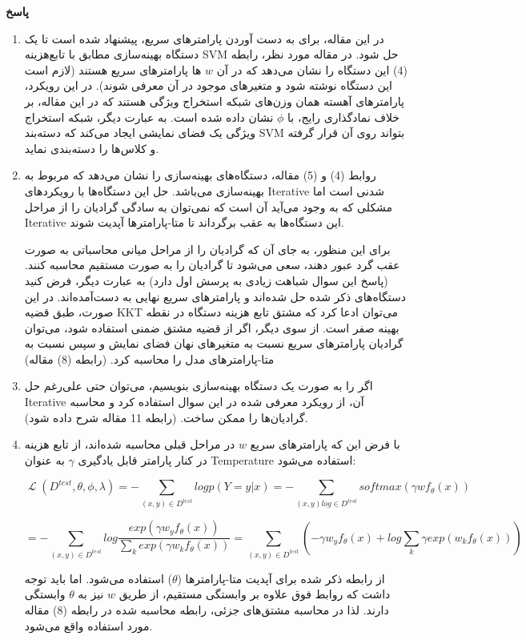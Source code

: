\documentclass{article}
\DeclareMathOperator{\Loss}{\mathcal{L}}
\begin{document}
\textbf{پاسخ}
\begin{enumerate}
	\item
	در این مقاله، برای به دست آوردن پارامترهای سریع، پیشنهاد شده است تا یک دستگاه بهینه‌سازی مطابق با تابع‌هزینه SVM حل شود. در مقاله مورد نظر، رابطه (4) این دستگاه را نشان می‌دهد که در آن 	$w$ ها پارامترهای سریع هستند (لازم است این دستگاه نوشته شود و متغیرهای موجود در آن معرفی شوند). در این رویکرد، پارامترهای آهسته همان وزن‌های شبکه استخراج ویژگی هستند که در این مقاله، بر خلاف نمادگذاری رایج، با 
	$\phi$
	نشان داده شده است. به عبارت دیگر، شبکه استخراج ویژگی یک فضای نمایشی ایجاد می‌کند که دسته‌بند SVM بتواند روی آن قرار گرفته و کلاس‌ها را دسته‌بندی نماید.
	\item
	روابط (4) و (5) مقاله، دستگاه‌های بهینه‌سازی را نشان‌ می‌دهد که مربوط به بهینه‌سازی 
	می‌باشد. حل این دستگاه‌ها با رویکردهای Iterative شدنی است اما مشکلی که به وجود می‌آید آن است که نمی‌توان به سادگی گرادیان را از مراحل Iterative این دستگاه‌ها به عقب برگرداند تا متا-پارامترها آپدیت شوند.
	
	برای این منظور، به جای آن که گرادیان را از مراحل میانی محاسباتی به صورت عقب گرد عبور دهند، سعی می‌شود تا گرادیان را به صورت مستقیم محاسبه کنند. (پاسخ این سوال شباهت زیادی به پرسش اول دارد) به عبارت دیگر، فرض کنید دستگاه‌های ذکر شده حل شده‌اند و پارامتر‌های سریع نهایی به دست‌آمده‌اند. در این صورت، طبق قضیه KKT می‌توان ادعا کرد که مشتق تابع هزینه دستگاه در نقطه بهینه صفر است. از سوی دیگر، اگر از قضیه مشتق ضمنی استفاده شود، می‌توان گرادیان پارامتر‌های سریع نسبت به متغیرهای نهان فضای نمایش و سپس نسبت به متا-پارامترهای مدل را محاسبه کرد. (رابطه (8) مقاله)
	
	\item
	اگر 
	را به صورت یک دستگاه بهینه‌سازی بنویسیم، می‌توان حتی علی‌رغم حل Iterative آن، از رویکرد معرفی شده در این سوال استفاده کرد و محاسبه گرادیان‌ها را ممکن ساخت. (رابطه 11 مقاله شرح داده شود).
	
	\item
با فرض این که پارامترهای سریع 
$w$
در مراحل قبلی محاسبه شده‌اند، از تابع هزینه 
در کنار پارامتر قابل یادگیری 
$\gamma$
به عنوان Temperature استفاده می‌شود:

$$\Loss(D^{test}, \theta, \phi, \lambda) = - \sum_{(x,y) \in D^{test}} log p(Y=y|x) = - \sum_{(x,y) log \in D^{test}} softmax (\gamma w f_{\theta}(x) ) $$

$$ = - \sum_{(x,y) \in D^{test}} log \frac{exp (\gamma w_y f_{\theta}(x))}{\sum_k exp (\gamma w_k f_{\theta}(x))} = \sum_{(x,y) \in D^{test}} (-\gamma w_y f_{\theta}(x) + log \sum_k \gamma exp (w_k f_{\theta}(x)))$$
	
از رابطه ذکر شده برای آپدیت متا-پارامترها ($\theta$) استفاده می‌شود. اما باید توجه داشت که روابط فوق علاوه بر وابستگی مستقیم، از طریق 
$w$
نیز به 
$\theta$
وابستگی دارند. لذا در محاسبه مشتق‌های جزئی، رابطه محاسبه شده در رابطه (8) مقاله مورد استفاده واقع می‌شود.

\end{enumerate}
\end{document}

